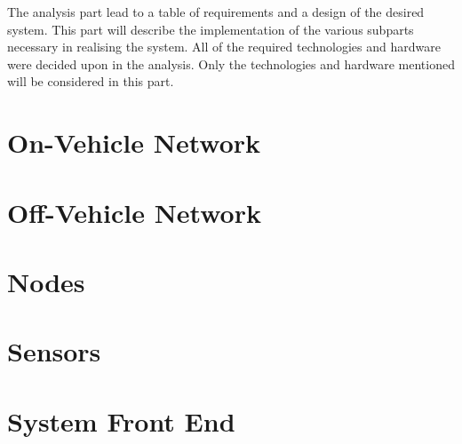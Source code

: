 The analysis part lead to a table of requirements and a design of the desired system.
This part will describe the implementation of the various subparts necessary in realising the system.
All of the required technologies and hardware were decided upon in the analysis.
Only the technologies and hardware mentioned will be considered in this part.
\section{On-Vehicle Network}






\section{Off-Vehicle Network}
\label{sec:wifi}

\section{Nodes}

\section{Sensors}

\section{System Front End}
